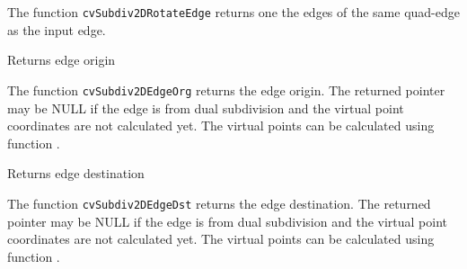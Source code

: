 
\begin{description}
\end{description}

The function \texttt{cvSubdiv2DRotateEdge} returns one the edges of the same quad-edge as the input edge.

\label{Subdiv2DEdgeOrg}

Returns edge origin


\begin{description}
\end{description}

The function \texttt{cvSubdiv2DEdgeOrg} returns the edge
origin. The returned pointer may be NULL if the edge is from dual
subdivision and the virtual point coordinates are not calculated
yet. The virtual points can be calculated using function
.

\label{Subdiv2DEdgeDst}

Returns edge destination


\begin{description}
\end{description}

The function \texttt{cvSubdiv2DEdgeDst} returns the edge destination. The
returned pointer may be NULL if the edge is from dual subdivision and
the virtual point coordinates are not calculated yet. The virtual points
can be calculated using function .

